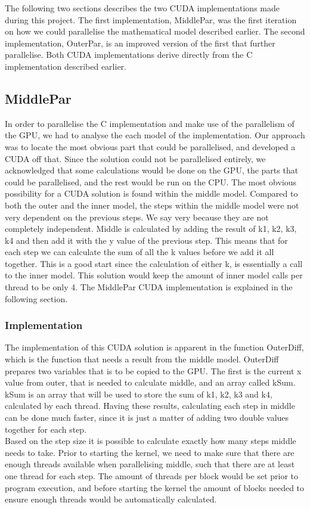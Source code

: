 The following two sections describes the two CUDA implementations made during this project. The first implementation, MiddlePar, was the first iteration on how we could parallelise the mathematical model described earlier. The second implementation, OuterPar, is an improved version of the first that further parallelise. Both CUDA implementations derive directly from the C implementation described earlier.

\subsection{MiddlePar} \hfill
In order to parallelise the C implementation and make use of the parallelism of the GPU, we had to analyse the each model of the implementation. Our approach was to locate the most obvious part that could be parallelised, and developed a CUDA off that. Since the solution could not be parallelised entirely, we acknowledged that some calculations would be done on the GPU, the parts that could be parallelised, and the rest would be run on the CPU. The most obvious possibility for a CUDA solution is found within the middle model. Compared to both the outer and the inner model, the steps within the middle model were not very dependent on the previous steps. We say very because they are not completely independent. Middle is calculated by adding the result of k1, k2, k3, k4 and then add it with the y value of the previous step. This means that for each step we can calculate the sum of all the k values before we add it all together. This is a good start since the calculation of either k, is essentially a call to the inner model. This solution would keep the amount of inner model calls per thread to be only 4. The MiddlePar CUDA implementation is explained in the following section.

\subsubsection{Implementation} \hfill
The implementation of this CUDA solution is apparent in the function OuterDiff, which is the function that needs a result from the middle model. OuterDiff prepares two variables that is to be copied to the GPU. The first is the current x value from outer, that is needed to calculate middle, and an array called kSum. kSum is an array that will be used to store the sum of k1, k2, k3 and k4, calculated by each thread. Having these results, calculating each step in middle can be done much faster, since it is just a matter of adding two double values together for each step. \\
Based on the step size it is possible to calculate exactly how many steps middle needs to take. Prior to starting the kernel, we need to make sure that there are enough threads available when parallelising middle, such that there are at least one thread for each step. The amount of threads per block would be set prior to program execution, and before starting the kernel the amount of blocks needed to ensure enough threads would be automatically calculated.\\

